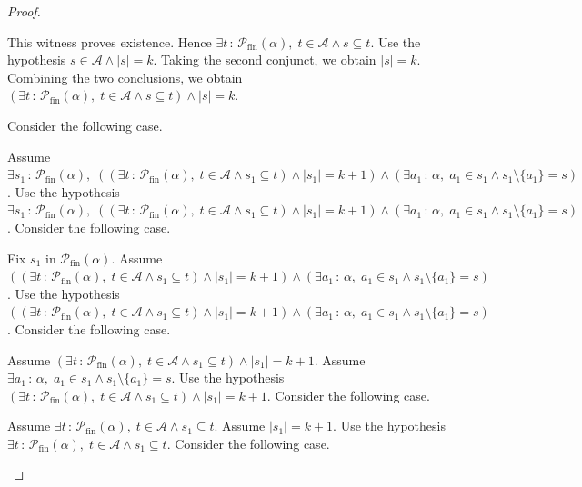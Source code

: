\documentclass{article}
\theoremstyle{paperresult}
\newenvironment{proofstep}{\par\smallskip\ifdim\leftskip<3em\relax\advance\leftskip by 1em\relax\fi\noindent\ignorespaces}{\par\smallskip}
\begin{document}
\begin{proof}
\begin{proofstep}
\begin{proofstep}
\begin{proofstep}
This witness proves existence. Hence \(\exists t\, :\, \mathcal{P}_{\mathrm{fin}}(\alpha),\; t \in \mathcal{A} \land s \subseteq t\).
Use the hypothesis \(s \in \mathcal{A} \land \left|s\right| = k\).
Taking the second conjunct, we obtain \(\left|s\right| = k\).
Combining the two conclusions, we obtain \((\exists t\, :\, \mathcal{P}_{\mathrm{fin}}(\alpha),\; t \in \mathcal{A} \land s \subseteq t) \land |s| = k\).
\end{proofstep}
Consider the following case.
\begin{proofstep}
Assume \(\exists s_{1}\, :\, \mathcal{P}_{\mathrm{fin}}(\alpha),\; ((\exists t\, :\, \mathcal{P}_{\mathrm{fin}}(\alpha),\; t \in \mathcal{A} \land s_{1} \subseteq t) \land |s_{1}| = k + 1) \land (\exists a_{1}\, :\, \alpha,\; a_{1} \in s_{1} \land s_{1} \setminus \{a_{1}\} = s)\).
Use the hypothesis \(\exists s_{1}\, :\, \mathcal{P}_{\mathrm{fin}}(\alpha),\; ((\exists t\, :\, \mathcal{P}_{\mathrm{fin}}(\alpha),\; t \in \mathcal{A} \land s_{1} \subseteq t) \land |s_{1}| = k + 1) \land (\exists a_{1}\, :\, \alpha,\; a_{1} \in s_{1} \land s_{1} \setminus \{a_{1}\} = s)\).
Consider the following case.
\begin{proofstep}
Fix \(s_{1}\) in \(\mathcal{P}_{\mathrm{fin}}(\alpha)\).
Assume \(((\exists t\, :\, \mathcal{P}_{\mathrm{fin}}(\alpha),\; t \in \mathcal{A} \land s_{1} \subseteq t) \land |s_{1}| = k + 1) \land (\exists a_{1}\, :\, \alpha,\; a_{1} \in s_{1} \land s_{1} \setminus \{a_{1}\} = s)\).
Use the hypothesis \(((\exists t\, :\, \mathcal{P}_{\mathrm{fin}}(\alpha),\; t \in \mathcal{A} \land s_{1} \subseteq t) \land |s_{1}| = k + 1) \land (\exists a_{1}\, :\, \alpha,\; a_{1} \in s_{1} \land s_{1} \setminus \{a_{1}\} = s)\).
Consider the following case.
\begin{proofstep}
Assume \((\exists t\, :\, \mathcal{P}_{\mathrm{fin}}(\alpha),\; t \in \mathcal{A} \land s_{1} \subseteq t) \land |s_{1}| = k + 1\).
Assume \(\exists a_{1}\, :\, \alpha,\; a_{1} \in s_{1} \land s_{1} \setminus \{a_{1}\} = s\).
Use the hypothesis \((\exists t\, :\, \mathcal{P}_{\mathrm{fin}}(\alpha),\; t \in \mathcal{A} \land s_{1} \subseteq t) \land |s_{1}| = k + 1\).
Consider the following case.
\begin{proofstep}
Assume \(\exists t\, :\, \mathcal{P}_{\mathrm{fin}}(\alpha),\; t \in \mathcal{A} \land s_{1} \subseteq t\).
Assume \(\left|s_{1}\right| = k + 1\).
Use the hypothesis \(\exists t\, :\, \mathcal{P}_{\mathrm{fin}}(\alpha),\; t \in \mathcal{A} \land s_{1} \subseteq t\).
Consider the following case.
\begin{proofstep}

\end{proofstep}
\end{proofstep}
\end{proofstep}
\end{proofstep}
\end{proofstep}
\end{proofstep}
\end{proofstep}
\end{proof}
\end{document}
